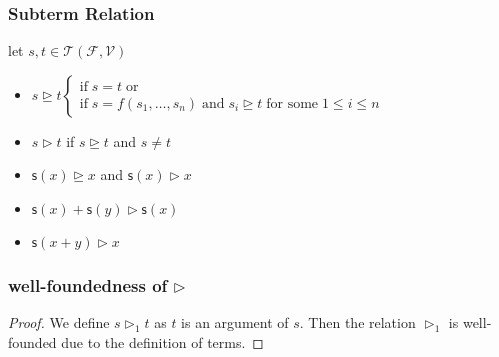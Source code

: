 \documentclass[12pt,aspectratio=169]{beamer}
\newcommand{\m}[1]{\mathsf{#1}}
\newcommand{\FF}{\mathcal{F}}
\newcommand{\VV}{\mathcal{V}}
\newcommand{\TT}{\mathcal{T}}
\begin{document}
\begin{frame}
    \frametitle{Subterm Relation}
    \begin{definition}
        let $s,t \in \TT(\FF,\VV)$
        \begin{itemize}
            \item $s \unrhd t \begin{cases}
                \text{if}\; s = t\; \text{or}\\
                \text{if}\; s = f(s_1,\dots,s_n)\; \text{and} \; s_i \unrhd t \; \text{for some} \; 1 \leq i \leq n
            \end{cases}$
            \item $s \rhd t$ if $s \unrhd t$ and $s \neq t$
        \end{itemize}
    \end{definition}

    \begin{example}
        \begin{itemize}
            \item $\m{s}(x) \unrhd x$ and $\m{s}(x) \rhd x$
            \item $\m{s}(x) + \m{s}(y) \rhd \m{s}(x)$
            \item $\m{s}(x + y) \rhd x$
        \end{itemize}
    \end{example}
\end{frame}

\begin{frame}
    \frametitle{well-foundedness of $\rhd$}
    \begin{comment}
    \begin{definition}
        $s \rhd_1 t$ if $s = f(s_1,\dots,s_n)$ and $s_i = t$ for some $1 \leq i \leq n$
    \end{definition}
    \begin{lemma}
        $\rhd_1$ is well-founded
    \end{lemma}
    \begin{proof}
        Suppose $s_1 \rhd_1 s_2 \rhd_1 s_3 \rhd_1 \cdots$.
        Then we have $f_1(\dots,f_2(\dots, f_3(\dots)\dots),\dots)$. By the definition of terms,
        we 
    \end{proof}
    \end{comment}

    \begin{lemma}
    \end{lemma}
    \begin{proof}
        We define $s \rhd_1 t$ as $t$ is an argument of $s$.
        Then the relation $\rhd_1$ is well-founded due to the definition of terms.
    \end{proof}
\end{frame}
\end{document}
